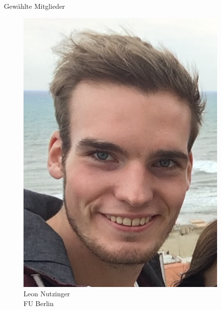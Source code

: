 \documentclass[compress, aspectratio=169]{beamer}
\begin{document}
\begin{frame}{Gewählte Mitglieder}
\begin{minipage}{.28\textwidth}
\begin{figure}
\begin{minipage}[r]{.57\textwidth}
        \includegraphics[height=0.3\textheight]{chris.jpeg}
      \end{minipage} \hfill
      \begin{minipage}[c]{.4\textwidth}
        \caption*{Leon Nutzinger \\FU Berlin}
      \end{minipage}
    \end{figure}
  \end{minipage}


\end{frame}
\end{document}
